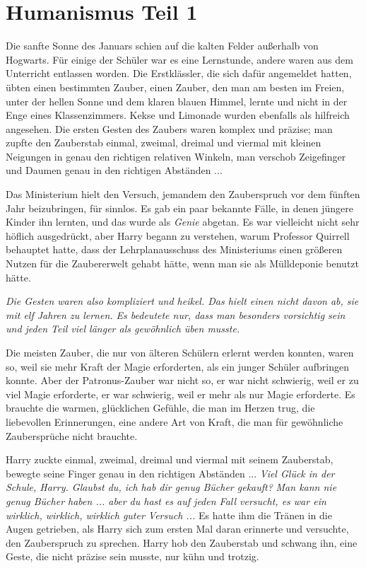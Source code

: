 \chapter{Humanismus Teil 1}

Die sanfte Sonne des Januars schien auf die kalten Felder außerhalb von
Hogwarts. Für einige der Schüler war es eine Lernstunde, andere waren aus dem
Unterricht entlassen worden. Die Erstklässler, die sich dafür angemeldet hatten,
übten einen bestimmten Zauber, einen Zauber, den man am besten im Freien, unter
der hellen Sonne und dem klaren blauen Himmel, lernte und nicht in der Enge
eines Klassenzimmers. Kekse und Limonade wurden ebenfalls als hilfreich
angesehen. Die ersten Gesten des Zaubers waren komplex und präzise; man zupfte
den Zauberstab einmal, zweimal, dreimal und viermal mit kleinen Neigungen in
genau den richtigen relativen Winkeln, man verschob Zeigefinger und Daumen genau
in den richtigen Abständen ...

Das Ministerium hielt den Versuch, jemandem den Zauberspruch vor dem fünften
Jahr beizubringen, für sinnlos. Es gab ein paar bekannte Fälle, in denen jüngere
Kinder ihn lernten, und das wurde als \glqq{}\emph{Genie}\grqq{} abgetan. Es war
vielleicht nicht sehr höflich ausgedrückt, aber Harry begann zu verstehen, warum
Professor Quirrell behauptet hatte, dass der Lehrplanausschuss des Ministeriums
einen größeren Nutzen für die Zaubererwelt gehabt hätte, wenn man sie als
Mülldeponie benutzt hätte.

\emph{Die Gesten waren also kompliziert und heikel. Das hielt einen nicht davon
ab, sie mit elf Jahren zu lernen. Es bedeutete nur, dass man besonders
vorsichtig sein und jeden Teil viel länger als gewöhnlich üben musste.}

Die meisten Zauber, die nur von älteren Schülern erlernt werden konnten, waren
so, weil sie mehr Kraft der Magie erforderten, als ein junger Schüler aufbringen
konnte. Aber der Patronus-Zauber war nicht so, er war nicht schwierig, weil er
zu viel Magie erforderte, er war schwierig, weil er mehr als nur Magie
erforderte. Es brauchte die warmen, glücklichen Gefühle, die man im Herzen trug,
die liebevollen Erinnerungen, eine andere Art von Kraft, die man für gewöhnliche
Zaubersprüche nicht brauchte.

Harry zuckte einmal, zweimal, dreimal und viermal mit seinem Zauberstab, bewegte
seine Finger genau in den richtigen Abständen ... \glqq{}\emph{Viel Glück in der
Schule, Harry. Glaubst du, ich hab dir genug Bücher gekauft?}\grqq{} \glqq{}
\emph{Man kann nie genug Bücher haben ... aber du hast es auf jeden Fall
versucht, es war ein wirklich, wirklich, wirklich guter Versuch ...\grqq{}} Es
hatte ihm die Tränen in die Augen getrieben, als Harry sich zum ersten Mal daran
erinnerte und versuchte, den Zauberspruch zu sprechen. Harry hob den Zauberstab
und schwang ihn, eine Geste, die nicht präzise sein musste, nur kühn und
trotzig.


